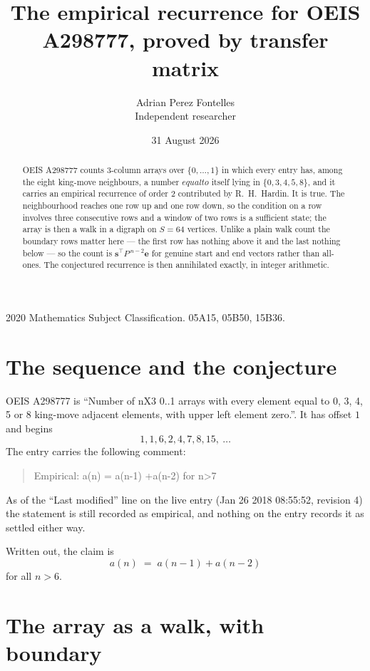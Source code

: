 \documentclass[11pt,a4paper]{article}
\title{The empirical recurrence for OEIS A298777, proved by transfer matrix}
\author{Adrian Perez Fontelles\\ \small Independent researcher}
\date{31 August 2026}
\theoremstyle{plain}
\theoremstyle{definition}
\begin{document}
\maketitle

\begin{abstract}
OEIS A298777 counts $3$-column arrays over $\{0,\dots,1\}$ in which every entry has,
among the eight king-move neighbours, a number $equal to$ itself lying in $\{0,3,4,5,8\}$, and it carries an empirical
recurrence of order $2$ contributed by R.~H.~Hardin. It is true. The neighbourhood
reaches one row up and one row down, so the condition on a row involves three consecutive
rows and a window of two rows is a sufficient state; the array is then a walk in a digraph
on $S=64$ vertices. Unlike a plain walk count the boundary rows matter here --- the first
row has nothing above it and the last nothing below --- so the count is
$\mathbf{s}^{\!\top}P^{\,n-2}\mathbf{e}$ for genuine start and end vectors rather than
all-ones. The conjectured recurrence is then annihilated exactly, in integer arithmetic.
\end{abstract}

\noindent\small 2020 Mathematics Subject Classification. 05A15, 05B50, 15B36.\normalsize

\section{The sequence and the conjecture}

OEIS A298777 is ``Number of nX3 0..1 arrays with every element equal to 0, 3, 4, 5 or 8 king-move adjacent elements, with upper left element zero.''. It has offset
$1$ and begins
\[
1, 1, 6, 2, 4, 7, 8, 15,\ \dots
\]
The entry carries the following comment:
\begin{quote}\small
Empirical: a(n) = a(n-1) +a(n-2) for n>7
\end{quote}
As of the ``Last modified'' line on the live entry (Jan 26 2018 08:55:52, revision
4) the statement is still recorded as empirical, and nothing on the entry
records it as settled either way.

Written out, the claim is
\begin{equation}\label{eq:conj}
a(n)\;=\;a(n-1) + a(n-2)
\end{equation}
for all $n>6$.

\section{The array as a walk, with boundary}
\end{document}
